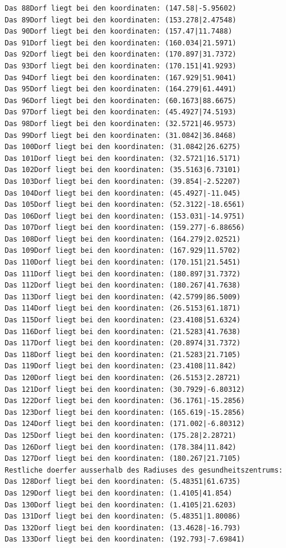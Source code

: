 \documentclass{article}
\begin{document}
\begin{verbatim}
Das 88Dorf liegt bei den koordinaten: (147.58|-5.95602)
Das 89Dorf liegt bei den koordinaten: (153.278|2.47548)
Das 90Dorf liegt bei den koordinaten: (157.47|11.7488)
Das 91Dorf liegt bei den koordinaten: (160.034|21.5971)
Das 92Dorf liegt bei den koordinaten: (170.897|31.7372)
Das 93Dorf liegt bei den koordinaten: (170.151|41.9293)
Das 94Dorf liegt bei den koordinaten: (167.929|51.9041)
Das 95Dorf liegt bei den koordinaten: (164.279|61.4491)
Das 96Dorf liegt bei den koordinaten: (60.1673|88.6675)
Das 97Dorf liegt bei den koordinaten: (45.4927|74.5193)
Das 98Dorf liegt bei den koordinaten: (32.5721|46.9573)
Das 99Dorf liegt bei den koordinaten: (31.0842|36.8468)
Das 100Dorf liegt bei den koordinaten: (31.0842|26.6275)
Das 101Dorf liegt bei den koordinaten: (32.5721|16.5171)
Das 102Dorf liegt bei den koordinaten: (35.5163|6.73101)
Das 103Dorf liegt bei den koordinaten: (39.854|-2.52207)
Das 104Dorf liegt bei den koordinaten: (45.4927|-11.045)
Das 105Dorf liegt bei den koordinaten: (52.3122|-18.6561)
Das 106Dorf liegt bei den koordinaten: (153.031|-14.9751)
Das 107Dorf liegt bei den koordinaten: (159.277|-6.88656)
Das 108Dorf liegt bei den koordinaten: (164.279|2.02521)
Das 109Dorf liegt bei den koordinaten: (167.929|11.5702)
Das 110Dorf liegt bei den koordinaten: (170.151|21.5451)
Das 111Dorf liegt bei den koordinaten: (180.897|31.7372)
Das 112Dorf liegt bei den koordinaten: (180.267|41.7638)
Das 113Dorf liegt bei den koordinaten: (42.5799|86.5009)
Das 114Dorf liegt bei den koordinaten: (26.5153|61.1871)
Das 115Dorf liegt bei den koordinaten: (23.4108|51.6324)
Das 116Dorf liegt bei den koordinaten: (21.5283|41.7638)
Das 117Dorf liegt bei den koordinaten: (20.8974|31.7372)
Das 118Dorf liegt bei den koordinaten: (21.5283|21.7105)
Das 119Dorf liegt bei den koordinaten: (23.4108|11.842)
Das 120Dorf liegt bei den koordinaten: (26.5153|2.28721)
Das 121Dorf liegt bei den koordinaten: (30.7929|-6.80312)
Das 122Dorf liegt bei den koordinaten: (36.1761|-15.2856)
Das 123Dorf liegt bei den koordinaten: (165.619|-15.2856)
Das 124Dorf liegt bei den koordinaten: (171.002|-6.80312)
Das 125Dorf liegt bei den koordinaten: (175.28|2.28721)
Das 126Dorf liegt bei den koordinaten: (178.384|11.842)
Das 127Dorf liegt bei den koordinaten: (180.267|21.7105)
Restliche doerfer ausserhalb des Radiuses des gesundheitszentrums: 
Das 128Dorf liegt bei den koordinaten: (5.48351|61.6735)
Das 129Dorf liegt bei den koordinaten: (1.4105|41.854)
Das 130Dorf liegt bei den koordinaten: (1.4105|21.6203)
Das 131Dorf liegt bei den koordinaten: (5.48351|1.80086)
Das 132Dorf liegt bei den koordinaten: (13.4628|-16.793)
Das 133Dorf liegt bei den koordinaten: (192.793|-7.69841)

\end{verbatim}
\end{document}
